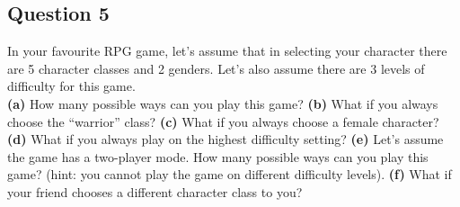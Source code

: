 
\subsection*{Question 5}
In your favourite RPG game, let's assume that in selecting your character there are 5 character classes and 2 genders. Let's also assume there are 3 levels of difficulty for this game.\\[-0.2cm]

{\bf(a)} How many possible ways can you play this game? 
{\bf(b)} What if you always choose the ``warrior'' class? 
{\bf(c)} What if you always choose a female character? 
{\bf(d)} What if you always play on the highest difficulty setting? 
{\bf(e)} Let's assume the game has a two-player mode. How many possible ways can you play this game? (hint: you cannot play the game on different difficulty levels). {\bf(f)} What if your friend chooses a different character class to you?


